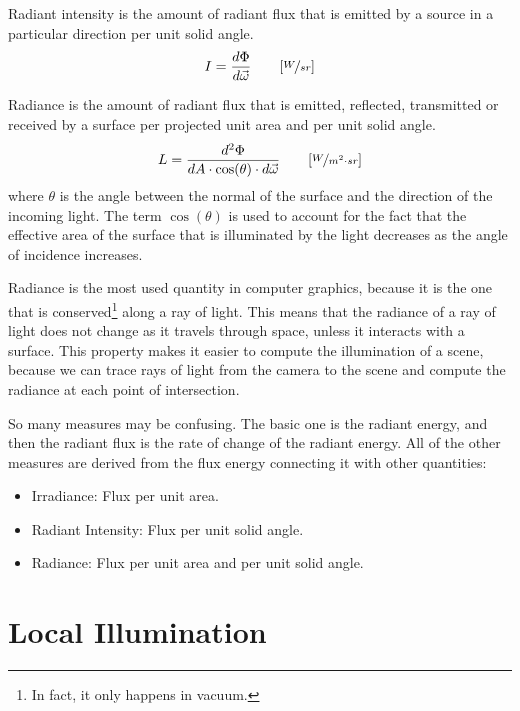 \begin{definicion}
Radiant intensity is the amount of radiant flux that is emitted by a source in a particular direction per unit solid angle.
\begin{equation*}
    I = \frac{d\Phi}{d\vec{\omega}} \qquad [\nicefrac{W}{sr}]
\end{equation*}
\end{definicion}

\begin{definicion}[Radiance]
Radiance is the amount of radiant flux that is emitted, reflected, transmitted or received by a surface per projected unit area and per unit solid angle.
\begin{equation*}
    L = \frac{d^2\Phi}{dA \cdot \cos(\theta) \cdot d\vec{\omega}} \qquad [\nicefrac{W}{m^2 \cdot sr}]
\end{equation*}
where $\theta$ is the angle between the normal of the surface and the direction of the incoming light. The term $\cos(\theta)$ is used to account for the fact that the effective area of the surface that is illuminated by the light decreases as the angle of incidence increases.
\end{definicion}
Radiance is the most used quantity in computer graphics, because it is the one that is conserved\footnote{In fact, it only happens in vacuum.} along a ray of light. This means that the radiance of a ray of light does not change as it travels through space, unless it interacts with a surface. This property makes it easier to compute the illumination of a scene, because we can trace rays of light from the camera to the scene and compute the radiance at each point of intersection.

\begin{observacion}
    So many measures may be confusing. The basic one is the radiant energy, and then the radiant flux is the rate of change of the radiant energy. All of the other measures are derived from the flux energy connecting it with other quantities:
\begin{itemize}
    \item Irradiance: Flux per unit area.
    \item Radiant Intensity: Flux per unit solid angle.
    \item Radiance: Flux per unit area and per unit solid angle.
\end{itemize}
\end{observacion}

\section{Local Illumination}

